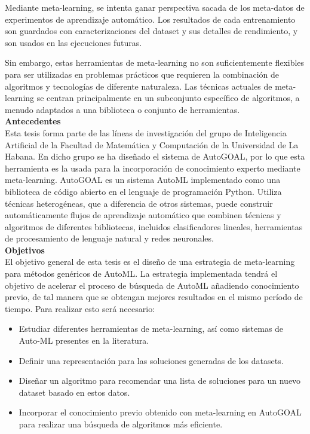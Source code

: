 Mediante meta-learning, se intenta ganar perspectiva sacada de los meta-datos
de experimentos de aprendizaje automático. Los resultados de cada entrenamiento
son guardados con caracterizaciones del dataset y sus detalles de rendimiento,
y son usados en las ejecuciones futuras.

Sin embargo, estas herramientas de meta-learning no son suficientemente
flexibles para ser utilizadas en problemas prácticos que requieren la
combinación de algoritmos y tecnologías de diferente naturaleza. Las técnicas
actuales de meta-learning se centran principalmente en un subconjunto
específico de algoritmos, a menudo adaptados a una biblioteca o conjunto de
herramientas.\\

\textbf{\Large Antecedentes}\\

Esta tesis forma parte de las líneas de investigación del grupo de Inteligencia
Artificial de la Facultad de Matemática y Computación de la Universidad de La
Habana. En dicho grupo se ha diseñado el sistema de AutoGOAL, por lo que esta
herramienta es la usada para la incorporación de conocimiento experto mediante
meta-learning. AutoGOAL es un sistema AutoML implementado como una biblioteca
de código abierto en el lenguaje de programación Python. Utiliza técnicas
heterogéneas, que a diferencia de otros sistemas, puede construir
automáticamente flujos de aprendizaje automático que combinen técnicas y
algoritmos de diferentes bibliotecas, incluidos clasificadores lineales,
herramientas de procesamiento de lenguaje natural y redes neuronales.\\

\textbf{\Large Objetivos}\\

El objetivo general de esta tesis es el diseño de una estrategia de
meta-learning para métodos genéricos de AutoML. La estrategia implementada
tendrá el objetivo de acelerar el proceso de búsqueda de AutoML añadiendo
conocimiento previo, de tal manera que se obtengan mejores resultados en el
mismo período de tiempo. Para realizar esto será necesario:

\begin{itemize}
    \item Estudiar diferentes herramientas de meta-learning, así como sistemas
    de Auto-ML presentes en la literatura.
    \item Definir una representación para las soluciones generadas de los
    datasets.
    \item Diseñar un algoritmo para recomendar una lista de soluciones para un
    nuevo dataset basado en estos datos.
    \item Incorporar el conocimiento previo obtenido con meta-learning en
    AutoGOAL para realizar una búsqueda de algoritmos más eficiente.
    
\end{itemize}

